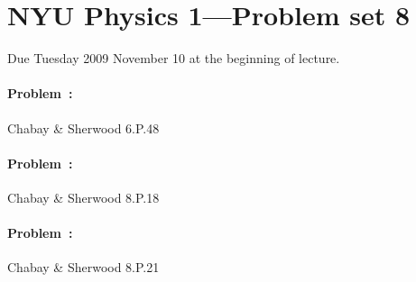 \documentclass[12pt]{article}
\newcounter{problem}
\begin{document}
\thispagestyle{empty}

\section*{NYU Physics 1---Problem set 8}

Due Tuesday 2009 November 10 at the beginning of lecture.

\paragraph{Problem~\theproblem:}%
Chabay \& Sherwood 6.P.48

\paragraph{Problem~\theproblem:}%
Chabay \& Sherwood 8.P.18

\paragraph{Problem~\theproblem:}%
Chabay \& Sherwood 8.P.21
\end{document}
